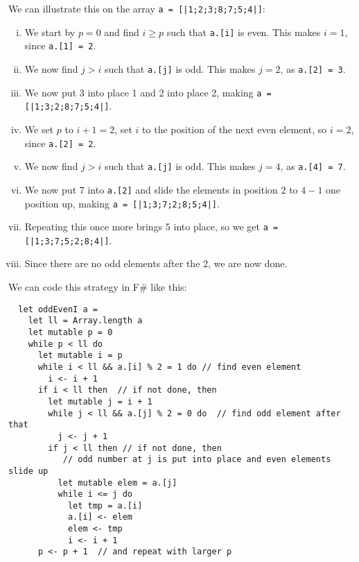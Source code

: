 \documentclass[a4paper]{article}
\begin{document}
\noindent
We can illustrate this on the array \texttt{a = [|1;2;3;8;7;5;4|]}:

\begin{enumerate}[i.]
\item We start by $p=0$ and find $i\geq p$ such that \texttt{a.[i]} is even.
This makes $i=1$, since \texttt{a.[1] = 2}.

\item We now find $j>i$ such that \texttt{a.[j]} is odd.  This makes $j=2$,
as \texttt{a.[2] = 3}.

\item We now put 3 into place 1 and 2 into place 2, making \texttt{a =
  [|1;3;2;8;7;5;4|]}.

\item We set $p$ to $i+1=2$, set $i$ to the position of the next even
element, so $i=2$, since \texttt{a.[2] = 2}.

\item We now find $j>i$ such that \texttt{a.[j]} is odd.  This makes $j=4$,
as \texttt{a.[4] = 7}.

\item We now put 7 into \texttt{a.[2]} and slide the elements in position 2
to $4-1$ one position up, making \texttt{a = [|1;3;7;2;8;5;4|]}.

\item Repeating this once more brings 5 into place, so we get \texttt{a =
  [|1;3;7;5;2;8;4|]}.

\item Since there are no odd elements after the 2, we are now done.

\end{enumerate}

\noindent
We can code this strategy in F\#{} like this:

\begin{verbatim}
  let oddEvenI a =
    let ll = Array.length a
    let mutable p = 0
    while p < ll do
      let mutable i = p
      while i < ll && a.[i] % 2 = 1 do // find even element
        i <- i + 1
      if i < ll then  // if not done, then
        let mutable j = i + 1
        while j < ll && a.[j] % 2 = 0 do  // find odd element after that
          j <- j + 1
        if j < ll then // if not done, then
           // odd number at j is put into place and even elements slide up
          let mutable elem = a.[j]
          while i <= j do
            let tmp = a.[i]
            a.[i] <- elem
            elem <- tmp
            i <- i + 1
      p <- p + 1  // and repeat with larger p
\end{verbatim}
\end{document}

